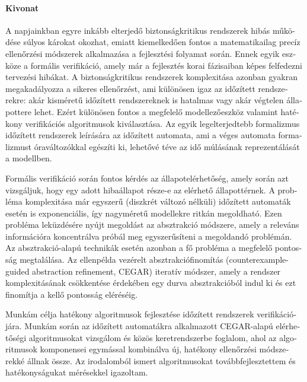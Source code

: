 \begin{otherlanguage}{magyar}

  \paragraph*{Kivonat}
  \thispagestyle{plain}
  
 A napjainkban egyre inkább elterjedő biztonságkritikus rendszerek hibás működése súlyos károkat okozhat, emiatt kiemelkedően fontos a matematikailag precíz ellenőrzési módszerek alkalmazása a fejlesztési folyamat során. Ennek egyik eszköze a formális verifikáció, amely már a fejlesztés korai fázisaiban képes felfedezni tervezési hibákat. A biztonságkritikus rendszerek komplexitása azonban gyakran megakadályozza a sikeres ellenőrzést, ami különösen igaz az időzített rendszerekre: akár kisméretű időzített rendszereknek is hatalmas vagy akár végtelen állapottere lehet. Ezért különösen fontos a megfelelő modellezőeszköz valamint hatékony verifikációs algoritmusok kiválasztása. Az egyik legelterjedtebb formalizmus időzített rendszerek leírására az időzített automata, ami a véges automata formalizmust óraváltozókkal egészíti ki, lehetővé téve az idő múlásának reprezentálását a modellben.
 
 Formális verifikáció során fontos kérdés az állapotelérhetőség, amely során azt vizsgáljuk, hogy egy adott hibaállapot része-e az elérhető állapottérnek. A probléma komplexitása már egyszerű (diszkrét változó nélküli) időzített automaták esetén is exponenciális, így nagyméretű modellekre ritkán megoldható. Ezen probléma leküzdésére nyújt megoldást az absztrakció módszere, amely a releváns információra koncentrálva próbál meg egyszerűsíteni a megoldandó problémán. Az absztrakció-alapú technikák esetén azonban a fő probléma a megfelelő pontosság megtalálása. Az ellenpélda vezérelt absztrakciófinomítás (counterexample-guided abstraction refinement, CEGAR) iteratív módszer, amely a rendszer komplexitásának csökkentése érdekében egy durva absztrakcióból indul ki és ezt finomítja a kellő pontosság eléréséig.
 
 Munkám célja hatékony algoritmusok fejlesztése időzített rendszerek verifikációjára. Munkám során az időzített automatákra alkalmazott CEGAR-alapú elérhetőségi algoritmusokat vizsgálom és közös keretrendszerbe foglalom, ahol az algoritmusok komponensei egymással kombinálva új, hatékony ellenőrzési módszerekké állnak össze. Az irodalomból ismert algoritmusokat továbbfejlesztettem és hatékonyságukat mérésekkel igazoltam. 

\end{otherlanguage}


